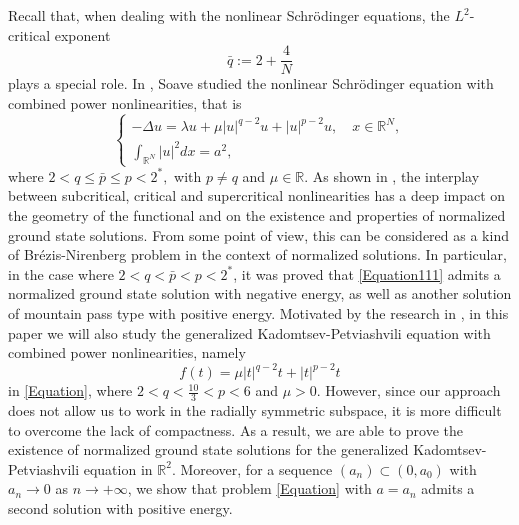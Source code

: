\documentclass[11pt]{amsart}
\numberwithin{equation}{section}
\begin{document}
{{{
Recall that, when dealing with the nonlinear Schr\"{o}dinger equations,  the $L^2$-critical exponent
$$
 \bar{q}:= 2 + \frac{4}{N}
 $$
plays a special role. In \cite{SoavenonC}, Soave studied the nonlinear Schr\"{o}dinger equation with combined power nonlinearities, that is
\begin{equation}\label{Equation111}
    \left\{\begin{array}{l}
        -\Delta u=\lambda u+\mu|u|^{q-2} u+|u|^{p-2} u,{\quad x \in \mathbb{R}^N, } \\[10pt]
        \displaystyle   \int_{\mathbb{R}^N}|u|^2 d x=a^2,
    \end{array}\right.
\end{equation}
where $2<q \leq \bar{p} \leq p<2^*,$ with $p \neq q$ and $\mu \in \mathbb{R}$. As shown in \cite{SoavenonC}, the interplay between subcritical, critical and supercritical nonlinearities has a deep impact on the geometry of the functional and on the existence and properties of normalized ground state solutions. From some point of view, this can be considered as a kind of Br\'ezis-Nirenberg problem in the context of normalized solutions.
In particular, in the case where $2<q < \bar{p} < p<2^*$, it was proved that \eqref{Equation111}
admits a normalized ground state solution with negative energy,  as well as another solution of mountain pass type with positive energy.
Motivated by the research in \cite{SoavenonC}, in this paper we will also study the generalized Kadomtsev-Petviashvili equation with combined power nonlinearities, namely
$$ f(t)=\mu|t|^{q-2}t +|t|^{p-2}t$$
in \eqref{Equation}, where {$2<q<\frac{10}{3}<p<6$} and $\mu>0$.
However, since our approach does not allow us to work in the radially symmetric subspace, it is more difficult to overcome the lack of compactness. As a result, we are able to  prove the existence of normalized ground state solutions for the generalized Kadomtsev-Petviashvili equation in $\mathbb{R}^2$. Moreover, for a sequence $(a_n) \subset (0,a_0)$ with $a_n \to 0$ as $n \to+\infty$, we show that problem \eqref{Equation} with $a=a_n$ admits a second solution with positive energy.

}}}
\end{document}
